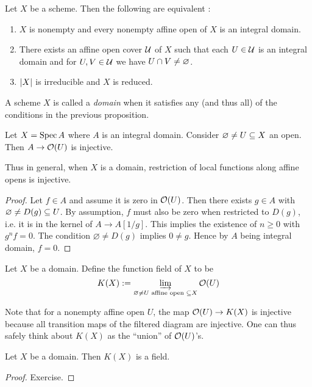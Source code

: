 \documentclass[./main.tex]{subfiles}
\begin{document}
\begin{prop}
  
  Let $X$ be a scheme.
  Then the following are equivalent : 
  \begin{enumerate}
    \item $X$ is nonempty and every nonempty affine open of $X$
    is an integral domain.
    \item There exists an affine open cover $\mathcal{U}$ of $X$
    such that each $U \in \mathcal{U}$ is an integral domain and
    for $U , V \in\mathcal{U}$ we have $U \cap V \neq \varnothing$.
    \item $\left\vert X \right\vert$ is irreducible and $X$ is reduced.
  \end{enumerate}
\end{prop}

\begin{dfn}
  
  A scheme $X$ is called a \emph{domain} when
  it satisfies any (and thus all) of the conditions in the previous proposition.
\end{dfn}

\begin{prop}
  
  Let $X = \operatorname{Spec} A$ where $A$ is an integral domain.
  Consider $\varnothing \neq U \subseteq X$ an open. 
  Then $A \to \mathcal{O}(U)$ is injective.

  Thus in general, when $X$ is a domain, 
  restriction of local functions along affine opens is injective.
\end{prop}
\begin{proof}
  Let $f \in A$ and assume it is zero in $\mathcal{O}(U)$.
  Then there exists $g \in A$ with 
  $\varnothing \neq D(g) \subseteq U$.
  By assumption, $f$ must also be zero when restricted to $D(g)$,
  i.e. it is in the kernel of $A \to A[1 / g]$.
  This implies the existence of $n \geq 0$ with $g^n f = 0$.
  The condition $\varnothing \neq D(g)$ implies $0 \neq g$.
  Hence by $A$ being integral domain,
  $f = 0$.
\end{proof}

\begin{dfn}
  
  Let $X$ be a domain.
  Define the function field of $X$ to be 
  \[
    K(X) := \varinjlim_{\varnothing \neq U \text{ affine open } \subseteq X} \mathcal{O}(U)  
  \]
\end{dfn}

Note that for a nonempty affine open $U$,
the map $\mathcal{O}(U) \to K(X)$ is injective
because all transition maps of the filtered diagram are injective.
One can thus safely think about $K(X)$ as the
``union'' of $\mathcal{O}(U)$'s.

\begin{prop}
  
  Let $X$ be a domain.
  Then $K(X)$ is a field.
\end{prop}
\begin{proof}
  Exercise.
\end{proof}
\end{document}
